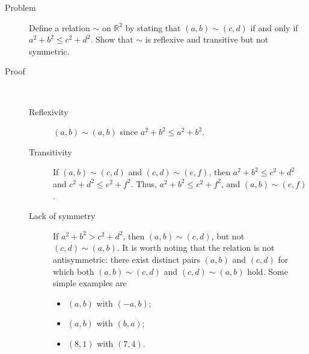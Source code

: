 \begin{description}
\item[Problem]
Define a relation $\sim$ on $\mathbb{R}^2$ by stating that $(a, b) \sim (c, d)$
if and only if $a^2 + b^2 \le c^2 + d^2$. Show that $\sim$ is reflexive and
transitive but not symmetric.
\item[Proof]~\\
\begin{description}
\item[Reflexivity] $(a, b) \sim (a, b)$ since $a^2 + b^2 \le a^2 + b^2$.
\item[Transitivity] If $(a, b) \sim (c, d)$ and $(c, d) \sim (e, f)$, then
$a^2 + b^2 \le c^2 + d^2$ and $c^2 + d^2 \le e^2 + f^2$. Thus, $a^2 + b^2 \le
e^2 + f^2$, and $(a, b) \sim (e, f)$.
\item[Lack of symmetry] If $a^2 + b^2 > c^2 + d^2$, then $(a, b) \sim (c, d)$,
but not $(c, d) \sim (a, b)$. It is worth noting that the relation is not
antisymmetric: there exist distinct pairs $(a, b)$ and $(c, d)$ for which both
$(a, b) \sim (c, d)$ and $(c, d) \sim (a, b)$ hold. Some simple examples are
\begin{itemize}
\item $(a, b)$ with $(-a, b)$;
\item $(a, b)$ with $(b, a)$;
\item $(8, 1)$ with $(7, 4)$.
\end{itemize}
\end{description}
\end{description}
